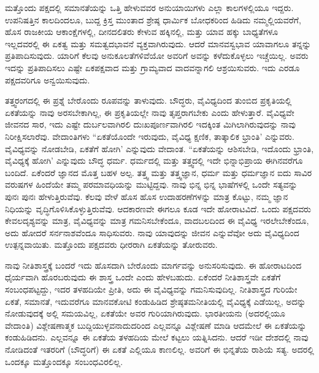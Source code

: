 ಮತ್ತೊಂದು ಪಕ್ಷದಲ್ಲಿ ಸಮಾನತೆಯನ್ನು ಒತ್ತಿ ಹೇಳುವವರ ಅನುಯಾಯಿಗಳು ಎಲ್ಲಾ ಕಾಲಗಳಲ್ಲಿಯೂ ಇದ್ದರು. ಉಪನಿಷತ್ತಿನ ಕಾಲದಿಂದಲೂ, ಬುದ್ದ ಕ್ರಿಸ್ತ ಮುಂತಾದ ಶ್ರೇಷ್ಠ ಧಾರ್ಮಿಕ ಬೋಧಕರಿಂದ ಹಿಡಿದು ನಮ್ಮಲ್ಲಿಯವರೆಗೆ, ಹೊಸ ರಾಜಕೀಯ ಆಕಾಂಕ್ಷೆಗಳಲ್ಲಿ, ದೀನದಲಿತರು ಕೇಳುವ ಹಕ್ಕಿನಲ್ಲಿ, ಮತ್ತು ಯಾವ ಹಕ್ಕು ಬಾಧ್ಯತೆಗಳೂ ಇಲ್ಲದವರಲ್ಲಿ ಈ ಏಕತ್ವ ಮತ್ತು ಸಮತ್ವದಭಾವನೆ ವ್ಯಕ್ತವಾಗಿರುವುದು. ಆದರೆ ಮಾನವಸ್ವಭಾವ ಯಾವಾಗಲೂ ತನ್ನನ್ನು ಪ್ರತಿಪಾದಿಸುವುದು. ಯಾರಿಗೆ ಕೆಲವು ಅನುಕೂಲತೆಗಳಿವೆಯೋ ಅವರಿಗೆ ಅವನ್ನು ಕಳೆದುಕೊಳ್ಳಲು ಇಚ್ಚೆಯಿಲ್ಲ. ಅವರು ಇದನ್ನು ಪ್ರತಿಪಾದಿಸಲು ಎಷ್ಟೇ ಏಕಪಕ್ಷವಾದ ಮತ್ತು ಗ್ರಾಮ್ಯವಾದ ವಾದವನ್ನಾಗಲಿ ಆಶ್ರಯಿಸುವರು. ಇದು ಎರಡೂ ಪಕ್ಷದವರಿಗೂ ಅನ್ವಯಿಸುವುದು.

ತತ್ತ್ವರಂಗದಲ್ಲಿ ಈ ಪ್ರಶ್ನೆ ಬೇರೊಂದು ರೂಪವನ್ನು ತಾಳುವುದು. ಬೌದ್ಧರು, ವೈವಿಧ್ಯದಿಂದ ತುಂಬಿದ ಪ್ರಕೃತಿಯಲ್ಲಿ ಏಕತೆಯನ್ನು ನಾವು ಅರಸಬೇಕಾಗಿಲ್ಲ, ಈ ಪ್ರಕೃತಿಯಲ್ಲೇ ನಾವು ತೃಪ್ತರಾಗಬೇಕು ಎಂದು ಹೇಳುತ್ತಾರೆ. ವೈವಿಧ್ಯವೇ ಜೀವನದ ಸಾರ, ಇದು ಎಷ್ಟೇ ದುರ್ಬಲವಾಗಿರಲಿ ದುಃಖಪೂರ್ಣವಾಗಿರಲಿ ಇದಕ್ಕಿಂತ ಮಿಗಿಲಾಗಿರುವುದನ್ನು ನಾವು ನಿರೀಕ್ಷಿಸಲಾರೆವು. ವೇದಾಂತಿಗಳು “ಏಕತೆಯೊಂದೇ ಇರುವುದು, ವೈವಿಧ್ಯ ಕ್ಷಣಿಕ, ತಾತ್ಕಾಲಿಕ ಭ್ರಾಂತಿ' ಎನ್ನುವರು. ವೈವಿಧ್ಯವನ್ನು ನೋಡಬೇಡಿ, ಏಕತೆಗೆ ಹೋಗಿ' ಎನ್ನುವುದು ವೇದಾಂತ. “ಏಕತೆಯನ್ನು ಆಶಿಸಬೇಡಿ, ಇದೊಂದು ಭ್ರಾಂತಿ, ವೈವಿಧ್ಯಕ್ಕೆ ಹೋಗಿ' ಎನ್ನುವುದು ಬೌದ್ಧ ಧರ್ಮ. ಧರ್ಮದಲ್ಲಿ ಮತ್ತು ತತ್ತ್ವದಲ್ಲಿ ಇದೇ ಭಿನ್ನಾಭಿಪ್ರಾಯ ಈಗಿನವರೆಗೂ ಬಂದಿದೆ. ಏಕೆಂದರೆ ಜ್ಞಾನದ ಮೊತ್ತ ಬಹಳ ಅಲ್ಪ. ತತ್ತ್ವ ಮತ್ತು ತತ್ತ್ವಜ್ಞಾನ, ಧರ್ಮ ಮತ್ತು ಧರ್ಮಜ್ಞಾನ ಐದು ಸಾವಿರ ವರುಷಗಳ ಹಿಂದೆಯೇ ತಮ್ಮ ಪರಮಾವಧಿಯನ್ನು ಮುಟ್ಟಿದ್ದವು. ನಾವು ಭಿನ್ನ ಭಿನ್ನ ಭಾಷೆಗಳಲ್ಲಿ ಒಂದೇ ಸತ್ಯವನ್ನು ಪುನಃ ಪುನಃ ಹೇಳುತ್ತಿರುವೆವು. ಕೆಲವು ವೇಳೆ ಹೊಸ ಹೊಸ ಉದಾಹರಣೆಗಳನ್ನು ಮಾತ್ರ ಕೊಟ್ಟು, ನಮ್ಮ ಜ್ಞಾನ ನಿಧಿಯನ್ನು ವೃದ್ಧಿಗೊಳಿಸಿಕೊಳ್ಳುತ್ತಿರುವೆವು. ಆದಕಾರಣವೇ ಈಗಲೂ ಕೂಡ ಇದೇ ಹೋರಾಟವಿದೆ. ಒಂದು ಪಕ್ಷದವರು ಕೇವಲ\break ದೃಶ್ಯವನ್ನು ಮಾತ್ರ, ವೈವಿಧ್ಯವನ್ನು ಮಾತ್ರ ಗಮನಿಸಬೇಕೆಂದೂ, ವಾದಬಲದಿಂದ ಈ ವೈವಿಧ್ಯ ಇರಲೇಬೇಕೆಂದೂ, ಅದು ಹೋದರೆ ಸರ್ನನಾಶವೆಂದೂ ಸಾಧಿಸುವರು. ನಾವು ಯಾವುದನ್ನು ಜೀವನ ಎನ್ನುವೆವೋ ಅದು ವೈವಿಧ್ಯದಿಂದ ಉತ್ಪನ್ನವಾಯಿತು. ಮತ್ತೊಂದು ಪಕ್ಷದವರು ಧೀರರಾಗಿ ಏಕತೆಯನ್ನು ತೋರುವರು.

ನಾವು ನೀತಿಶಾಸ್ತ್ರಕ್ಕೆ ಬಂದರೆ ಇದು ಹೊಸದಾಗಿ ಬೇರೊಂದು ಮಾರ್ಗವನ್ನು ಅನುಸರಿಸುವುದು. ಈ ಹೋರಾಟದಿಂದ ಧೈರ್ಯವಾಗಿ ಹೊರಬರುವುದು ಈ ಶಾಸ್ತ್ರ ಒಂದೇ ಎಂದು ಹೇಳಬಹುದು. ಏಕೆಂದರೆ ನೀತಿಶಾಸ್ತ್ರವೇ ಏಕತೆಗೆ ಸಂಬಂಧಪಟ್ಟದ್ದು, ಇದರ ತಳಹದಿಯೇ ಪ್ರೀತಿ, ಅದು ಈ ವೈವಿಧ್ಯವನ್ನು ಗಮನಿಸುವುದಿಲ್ಲ. ನೀತಿಶಾಸ್ತ್ರದ ಗುರಿಯೇ ಏಕತೆ, ಸಮಾನತೆ, ಇದುವರೆಗೂ ಮಾನವಕೋಟಿ ಕಂಡುಹಿಡಿದ ಶ್ರೇಷ್ಠತಮನೀತಿಯಲ್ಲಿ ವೈವಿಧ್ಯಕ್ಕೆ ಎಡೆಯಿಲ್ಲ, ಅದನ್ನು ನೋಡುವುದಕ್ಕೆ ಅಲ್ಲಿ ಸಮಯವಿಲ್ಲ, ಏಕತೆಯೇ ಅವರ ಗುರಿಯಾಗಿರುವುದು. ಭಾರತೀಯನು (ಅದರಲ್ಲಿಯೂ ವೇದಾಂತಿ) ವಿಶ್ಲೇಷಣಾತ್ಮಕ ಬುದ್ದಿಯುಳ್ಳವನಾದುದರಿಂದ ಎಲ್ಲವನ್ನೂ ವಿಶ್ಲೇಷಣೆ ಮಾಡಿ ಆದಮೇಲೆ ಈ ಏಕತೆಯನ್ನು ಕಂಡುಹಿಡಿದನು. ಎಲ್ಲವನ್ನೂ ಈ ಏಕತೆಯ ತಳಹದಿಯ ಮೇಲೆ ಕಟ್ಟಲು ಯತ್ನಿಸಿದನು. ಆದರೆ ಇಡೀ ದೇಶದಲ್ಲಿ ನಾವು ನೋಡಿದಂತೆ ಇತರರಿಗೆ (ಬೌದ್ಧರಿಗೆ) ಈ ಏಕತೆ ಎಲ್ಲಿಯೂ ಕಾಣಲಿಲ್ಲ. ಅವರಿಗೆ ಈ ಭಿನ್ನತೆಯ ರಾಶಿಯೆ ಸತ್ಯ. ಅದರಲ್ಲಿ ಒಂದಕ್ಕೂ ಮತ್ತೊಂದಕ್ಕೂ ಸಂಬಂಧವಿರಲಿಲ್ಲ.

